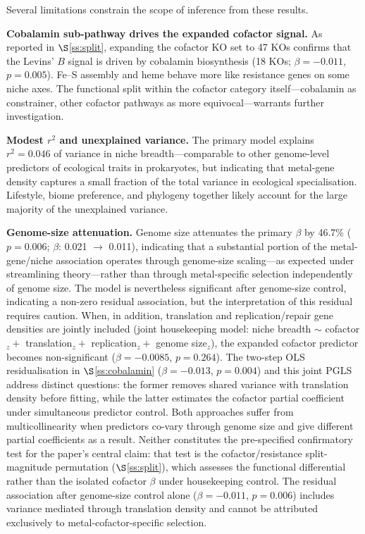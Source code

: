 \documentclass[times]{zHenriquesLab-StyleBioRxiv}
\begin{document}


Several limitations constrain the scope of inference from these results.

\textbf{Cobalamin sub-pathway drives the expanded cofactor signal.}
As reported in $\S$\ref{ss:split}, expanding the cofactor KO set to 47 KOs
confirms that the Levins' $B$ signal is driven by cobalamin biosynthesis
(18 KOs; $\beta = -0.011$, $p = 0.005$). Fe--S assembly and heme behave more
like resistance genes on some niche axes. The functional split within the
cofactor category itself---cobalamin as constrainer, other cofactor pathways
as more equivocal---warrants further investigation.

\textbf{Modest $r^2$ and unexplained variance.} The primary model explains
$r^2 = 0.046$ of variance in niche breadth---comparable to other genome-level
predictors of ecological traits in prokaryotes, but indicating that metal-gene
density captures a small fraction of the total variance in ecological
specialisation. Lifestyle, biome preference, and phylogeny together likely
account for the large majority of the unexplained variance.

\textbf{Genome-size attenuation.} Genome size attenuates the primary $\beta$ by
46.7\% ($p = 0.006$; $\beta$: 0.021 $\to$ 0.011), indicating that a
substantial portion of the metal-gene/niche association operates through
genome-size scaling---as expected under streamlining theory---rather than through
metal-specific selection independently of genome size. The model is nevertheless
significant after genome-size control, indicating a non-zero residual
association, but the interpretation of this residual requires caution.
When, in addition, translation and replication/repair gene densities are jointly
included (joint housekeeping model: niche breadth $\sim$ cofactor$_z +$ translation$_z +$
replication$_z +$ genome size$_z$), the expanded cofactor predictor becomes
non-significant ($\beta = -0.0085$, $p = 0.264$). The two-step OLS
residualisation in $\S$\ref{ss:cobalamin} ($\beta = -0.013$, $p = 0.004$) and
this joint PGLS address distinct questions: the former removes shared variance
with translation density before fitting, while the latter estimates the cofactor
partial coefficient under simultaneous predictor control. Both approaches suffer
from multicollinearity when predictors co-vary through genome size and give
different partial coefficients as a result. Neither constitutes the pre-specified
confirmatory test for the paper's central claim: that test is the
cofactor/resistance split-magnitude permutation ($\S$\ref{ss:split}), which
assesses the functional differential rather than the isolated cofactor $\beta$
under housekeeping control. The residual association after genome-size control
alone ($\beta = -0.011$, $p = 0.006$) includes variance mediated through
translation density and cannot be attributed exclusively to metal-cofactor-specific
selection.
\end{document}
